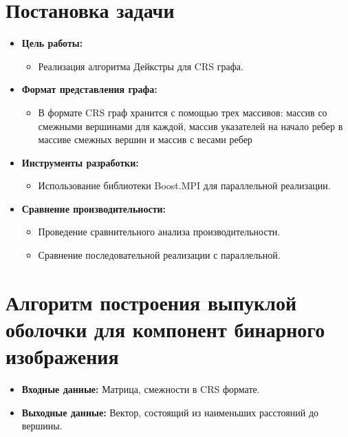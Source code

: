 \documentclass[12pt]{article}
\begin{document}
\section*{Постановка задачи}
\begin{itemize}
    \item \textbf{Цель работы:}
        \begin{itemize}
            \item Реализация алгоритма Дейкстры для CRS графа.
        \end{itemize}
    \item \textbf{Формат представления графа:}
        \begin{itemize}
           \item В формате CRS граф хранится с помощью трех массивов: массив со смежными вершинами для каждой, массив указателей на начало ребер в массиве смежных вершин и массив с весами ребер
        \end{itemize}
    \item \textbf{Инструменты разработки:}
        \begin{itemize}
             \item Использование библиотеки Boost.MPI для параллельной реализации.
        \end{itemize}
    \item \textbf{Сравнение производительности:}
         \begin{itemize}
            \item Проведение сравнительного анализа производительности.
            \item Сравнение последовательной реализации с параллельной.
         \end{itemize}
\end{itemize}
\newpage

\section*{Алгоритм построения выпуклой оболочки для компонент бинарного изображения}

\begin{itemize}
    \item[] \textbf{Входные данные:} Матрица, смежности в CRS формате.
    \item[] \textbf{Выходные данные:} Вектор, состоящий из наименьших расстояний до вершины.
\end{itemize}
\end{document}
